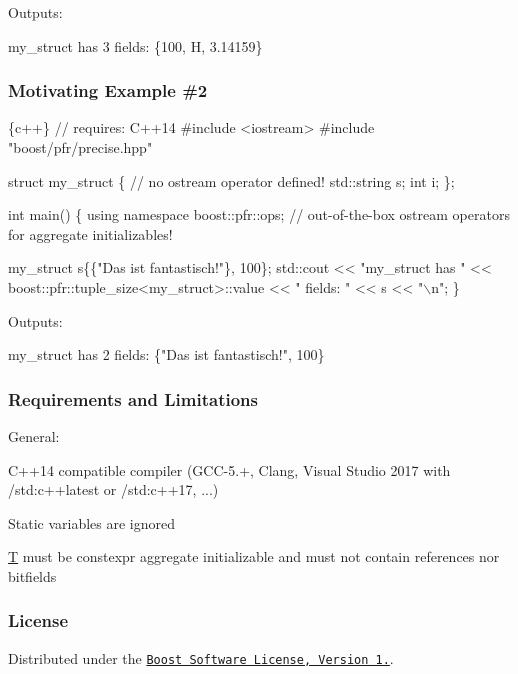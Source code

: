 Outputs\+: 
\begin{DoxyCode}
my\_struct has 3 fields: \{100, H, 3.14159\}
\end{DoxyCode}


\subsubsection*{Motivating Example \#2}


\begin{DoxyCode}
\{c++\}
// requires: C++14
#include <iostream>
#include "boost/pfr/precise.hpp"

struct my\_struct \{ // no ostream operator defined!
    std::string s;
    int i;
\};

int main() \{
    using namespace boost::pfr::ops; // out-of-the-box ostream operators for aggregate initializables!

    my\_struct s\{\{"Das ist fantastisch!"\}, 100\};
    std::cout << "my\_struct has " << boost::pfr::tuple\_size<my\_struct>::value
        << " fields: " << s << "\(\backslash\)n";
\}
\end{DoxyCode}


Outputs\+: 
\begin{DoxyCode}
my\_struct has 2 fields: \{"Das ist fantastisch!", 100\}
\end{DoxyCode}


\subsubsection*{Requirements and Limitations}

General\+:
\begin{DoxyItemize}
\item C++14 compatible compiler (G\+C\+C-\/5.+, Clang, Visual Studio 2017 with /std\+:c++latest or /std\+:c++17, ...)
\item Static variables are ignored
\item \mbox{\hyperlink{struct_t}{T}} must be constexpr aggregate initializable and must not contain references nor bitfields
\end{DoxyItemize}

\subsubsection*{License}

Distributed under the \href{http://boost.org/LICENSE_1_0.txt}{\tt Boost Software License, Version 1.}. 